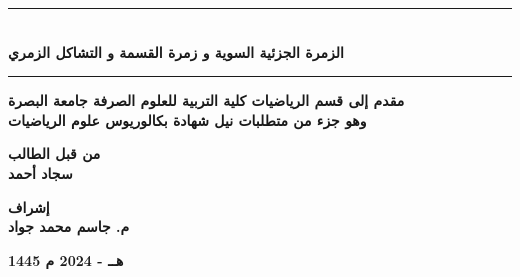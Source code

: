 \begin{titlepage}
	\vspace{1cm}
	
	\begin{center}
		\rule{100mm}{0.5mm}\\
		\vspace{1cm}
		\large \textbf{الزمرة الجزئية السوية و زمرة القسمة و التشاكل الزمري}\\
		\vspace{12pt}
		\rule{100mm}{0.5mm}
	\end{center}
	\vfill
	\begin{center}
		\textbf{مقدم إلى قسم الرياضيات كلية التربية للعلوم الصرفة جامعة البصرة\\
			\vspace{6pt}
			وهو جزء من متطلبات نيل شهادة بكالوريوس علوم الرياضيات}
	\end{center}
	\vfill
	\begin{center}
		\textbf{من قبل الطالب}\\
		\vspace{8pt}
		\textbf{سجاد أحمد}
	\end{center}
	\vspace{10pt}
	\begin{center}
		\textbf{إشراف}\\
		\vspace{8pt}
		\textbf{م. جاسم محمد جواد}
	\end{center}
	\vspace{10pt}
	\begin{center}
		\textbf{1445 ه‍ــ - 2024 م}
	\end{center}
\end{titlepage}
\restoregeometry
